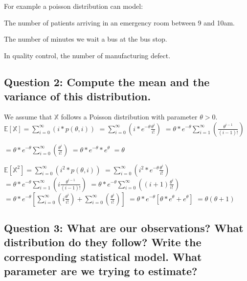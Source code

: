 \documentclass[]{article}
\begin{document}
For example a poisson distribution can model:

\begin{itemsize}
\item The number of patients arriving in an emergency room between 9 and 10am.
\item The number of minutes we wait a bus at the bus stop.
\item In quality control, the number of manufacturing defect.
\end{itemsize}

\hypertarget{question-2-compute-the-mean-and-the-variance-of-this-distribution.}{%
\subsection{Question 2: Compute the mean and the variance of this
distribution.}\label{question-2-compute-the-mean-and-the-variance-of-this-distribution.}}

We assume that \(\mathbb{X}\) follows a Poisson distribution with
parameter \(\theta > 0\).
\(\mathbb{E}[\mathbb{X}] = \sum_{i=0}^{\infty} (i * p(\theta, i))\)
\(= \sum_{i=0}^{\infty} (i*e^{-\theta} \frac{\theta^{i}}{i!})\)
\(= \theta * e^{-\theta}\sum_{i=1}^{\infty} (\frac{\theta^{i-1}}{(i-1)!})\)

\(= \theta * e^{-\theta}\sum_{i=0}^{\infty} (\frac{\theta^{i}}{i!})\)
\(= \theta * e^{-\theta} * e^{\theta}\) \(= \theta\)

\(\mathbb{E}[\mathbb{X}^2] = \sum_{i=0}^{\infty} (i^2 * p(\theta, i))\)
\(= \sum_{i=0}^{\infty} (i^2*e^{-\theta} \frac{\theta^{i}}{i!})\)
\(= \theta * e^{-\theta}\sum_{i=1}^{\infty} (i\frac{\theta^{i-1}}{(i-1)!})\)
\newline
\(= \theta * e^{-\theta}\sum_{i=0}^{\infty} ((i+1)\frac{\theta^{i}}{i!})\)
\(= \theta * e^{-\theta}[\sum_{i=0}^{\infty} (i\frac{\theta^{i}}{i!}) + \sum_{i=0}^{\infty} (\frac{\theta^{i}}{i!})]\)
\newline \(= \theta * e^{-\theta}[\theta * e^{\theta} + e^{\theta}]\)
\(= \theta (\theta + 1)\)

\hypertarget{question-3-what-are-our-observations-what-distribution-do-they-follow-write-the-corresponding-statistical-model.-what-parameter-are-we-trying-to-estimate}{%
\subsection{Question 3: What are our observations? What distribution do
they follow? Write the corresponding statistical model. What parameter
are we trying to
estimate?}\label{question-3-what-are-our-observations-what-distribution-do-they-follow-write-the-corresponding-statistical-model.-what-parameter-are-we-trying-to-estimate}}
\end{document}
